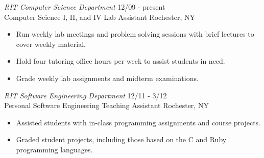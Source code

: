 \documentclass[line,margin]{res}
\begin{document}
\begin{resume}
	{\sl RIT Computer Science Department} \hfill    12/09 - present\\
	Computer Science I, II, and IV Lab Assistant \hfill Rochester, NY
	\begin{itemize} \itemsep -2pt %
	\item Run weekly lab meetings and problem solving sessions with brief lectures to cover weekly material.
	\item Hold four tutoring office hours per week to assist students in need.
	\item Grade weekly lab assignments and midterm examinations.
	\end{itemize}

\begin{comment}
	{\sl RIT Software Engineering Department} \hfill    1/12 - 5/12\\
	Data Structures and Algorithms Tutor \hfill Rochester, NY
	\begin{itemize} \itemsep -2pt %
	\item Provided personal assistance for students trying to understand the material tought in the course.
	\item Analyzed design and implementation decisions for course projects.
	\end{itemize}

{\sl RIT Computer Science Department} \hfill   9/10 - 3/11 \\
                Computer Organization Grader \hfill Rochester, NY
                 \begin{itemize}  \itemsep -2pt %
                 \item Graded weekly programming assignments and long-term projects with automated test programs and manual MIPS assembly inspection.
                 \item Assisted in grading of midterm and final examinations.
                 \end{itemize} 

\end{comment}

	{\sl RIT Software Engineering Department} \hfill    12/11 - 3/12\\
	Personal Software Engineering Teaching Assistant \hfill Rochester, NY
	\begin{itemize} \itemsep -2pt %
	\item Assisted students with in-class programming assignments and course projects.
	\item Graded student projects, including those based on the C and Ruby programming languages.
	\end{itemize}


\end{resume}
\end{document}
